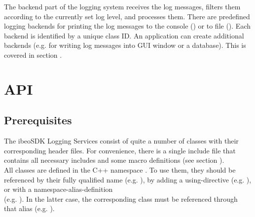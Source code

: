 The backend part of the logging system receives the log messages, filters them according to the currently set log level, and processes them. There are predefined logging backends for printing the log messages to the console () or to file (). Each backend is identified by a unique class ID. An application can create additional backends (e.g. for writing log messages into GUI window or a database). This is covered in section .

\newpage



\section{API} \label{sec:api}

\subsection{Prerequisites}
The ibeoSDK Logging Services consist of quite a number of classes with their corresponding header files. For convenience, there is a single include file  that contains all necessary includes and some macro definitions (see section ).\\
All classes are defined in the C++ namespace . To use them, they should be referenced by their fully qualified name (e.g. ), by adding a using-directive (e.g. ), or with a namespace-alias-definition\\ (e.g. ). In the latter case, the corresponding class must be referenced through that alias (e.g. ).


